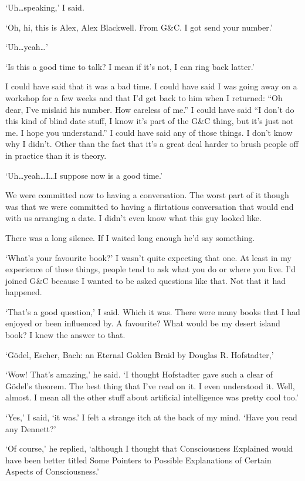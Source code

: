 `Uh\dots speaking,' I said.

`Oh, hi, this is Alex, Alex Blackwell. From G{\&}C. I got send your
number.'

`Uh\dots yeah\dots'

`Is this a good time to talk? I mean if it's not, I can ring back
latter.'

I could have said that it was a bad time. I could have said I was
going away on a workshop for a few weeks and that I'd get back to
him when I returned: ``Oh dear, I've mislaid his number. How
careless of me.'' I could have said ``I don't do this kind of blind
date stuff, I know it's part of the G{\&}C thing, but it's just not
me. I hope you understand.'' I could have said any of those things.
I don't know why I didn't. Other than the fact that it's a great
deal harder to brush people off in practice than it is theory.

`Uh\dots yeah\dots I\dots I suppose now is a good time.'

We were committed now to having a conversation. The worst part of it
though was that we were committed to having a flirtatious
conversation that would end with us arranging a date. I didn't even
know what this guy looked like.

There was a long silence. If I waited long enough he'd say
something.

`What's your favourite book?' I wasn't quite expecting that one. At
least in my experience of these things, people tend to ask what you
do or where you live. I'd joined G{\&}C because I wanted to be asked
questions like that. Not that it had happened.

`That's a good question,' I said. Which it was. There were many
books that I had enjoyed or been influenced by. A favourite? What
would be my desert island book? I knew the answer to that.

`{\twelvesl Gödel, Escher, Bach: an Eternal Golden Braid\/} by
Douglas R. Hofstadter,'

`Wow! That's amazing,' he said. `I thought Hofstadter gave such a
clear of Gödel's theorem. The best thing that I've read on it. I
even understood it. Well, almost. I mean all the other stuff about
artificial intelligence was pretty cool too.'

`Yes,' I said, `it was.' I felt a strange itch at the back of my
mind. `Have you read any Dennett?'

`Of course,' he replied, `although I thought that {\twelvesl Consciousness
Explained\/} would have been better titled {\twelvesl Some Pointers to Possible
Explanations of Certain Aspects of Consciousness}.'

